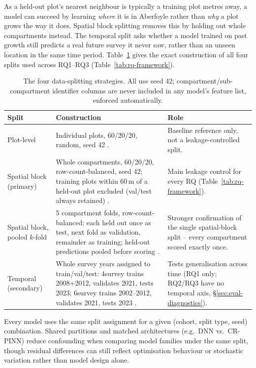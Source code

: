 As a held-out plot's nearest neighbour is typically a training plot metres away, a model can succeed by learning \emph{where} it is in Aberfoyle rather than \emph{why} a plot grows the way it does. Spatial block splitting removes this by holding out whole compartments instead. The temporal split asks whether a model trained on past growth still predicts a real future survey it never saw, rather than an unseen location in the same time period. Table~\ref{tab:splits-summary} gives the exact construction of all four splits used across RQ1--RQ3 (Table~\ref{tab:rq-framework}).

\begin{table}[!htbp]
\centering
\scriptsize
\renewcommand{\arraystretch}{1.2}
\begin{tabular}{p{2.1cm}p{5.1cm}p{5.3cm}}
\toprule
Split & Construction & Role \\
\midrule
Plot-level & Individual plots, 60/20/20, random, seed 42 \ct{source that uses plot-level split}. & Baseline reference only, not a leakage-controlled split. \\
Spatial block (primary) & Whole compartments, 60/20/20, row-count-balanced, seed 42; training plots within 60\,m of a held-out plot excluded (val/test always retained) \cite{roberts2017Cross_C5_EVAL}. & Main leakage control for every RQ (Table~\ref{tab:rq-framework}). \\
Spatial block, pooled $k$-fold & 5 compartment folds, row-count-balanced; each held out once as test, next fold as validation, remainder as training; held-out predictions pooled before scoring \cite{ploton2020Spatial_C5_EVAL}. & Stronger confirmation of the single spatial-block split -- every compartment scored exactly once. \\
Temporal (secondary) & Whole survey years assigned to train/val/test: 4survey trains 2008+2012, validates 2021, tests 2023; 6survey trains 2002--2012, validates 2021, tests 2023 \cite{lynch2025Digital_C4_NN}. & Tests generalisation across time (RQ1 only; RQ2/RQ3 have no temporal axis, \S\ref{sec:eval-diagnostics}). \\
\bottomrule
\end{tabular}
\caption{The four data-splitting strategies. All use seed 42; compartment/sub-compartment
identifier columns are never included in any model's feature list, enforced automatically.}
\label{tab:splits-summary}
\end{table}

Every model uses the same split assignment for a given (cohort, split type, seed) combination. Shared partitions and matched architectures (e.g.\ DNN vs.\ CR-PINN) reduce confounding when comparing model families under the same split, though residual differences can still reflect optimisation behaviour or stochastic variation rather than model design alone.

